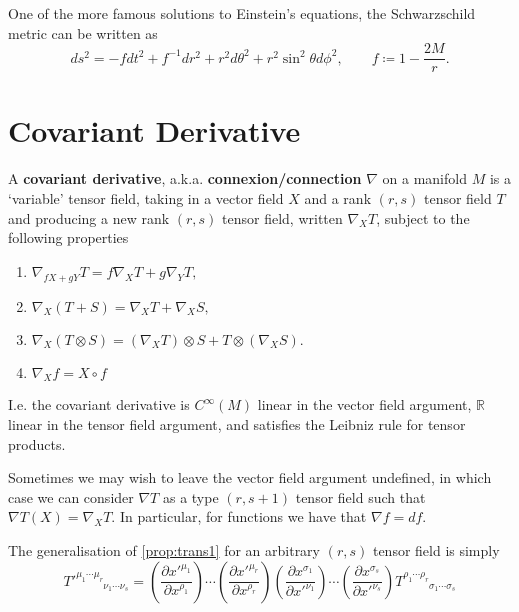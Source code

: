 \documentclass[12pt]{article}
\begin{document}
\begin{example}
	One of the more famous solutions to Einstein's equations, the Schwarzschild metric can be written as
		\begin{equation}
			ds^2 = -f dt^2 + f^{-1} dr^2 + r^2 d\theta^2 + r^2 \sin^2\theta d \phi^2, \qquad f \coloneqq 1 - \frac{2M}{r}.
		\end{equation}
\end{example}

\section{Covariant Derivative}

\begin{definition}
	A \textbf{covariant derivative}, a.k.a. \textbf{connexion/connection} $\nabla$ on a manifold $M$ is a `variable' tensor field, taking in a vector field $X$ and a rank $(r,s)$ tensor field $T$ and producing a new rank $(r,s)$ tensor field, written $\nabla_X T$, subject to the following properties
		\begin{enumerate}
			\item $\nabla_{fX + gY} T = f \nabla_X T + g \nabla_Y T,$
			\item $\nabla_X(T + S) = \nabla_X T + \nabla_X S, $
			\item $\nabla_X(T \otimes S) = \left( \nabla_X T \right) \otimes S + T \otimes \left( \nabla_X S \right).$
			\item $\nabla_X f = X \circ f$
		\end{enumerate}
	I.e. the covariant derivative is $C^\infty(M)$ linear in the vector field argument, $\mathbb{R}$ linear in the tensor field argument, and satisfies the Leibniz rule for tensor products.
\end{definition}
\begin{remark}
	Sometimes we may wish to leave the vector field argument undefined, in which case we can consider $\nabla T$ as a type $(r,s+1)$ tensor field such that $\nabla T (X) = \nabla_X T$. In particular, for functions we have that $\nabla f = df$.
\end{remark}

\begin{noteEquation}
	The generalisation of \autoref{prop:trans1} for an arbitrary $(r,s)$ tensor field is simply
		\begin{equation}
			T'^{\mu_1 \cdots \mu_r}_{\phantom{\mu_1 \cdots \mu_r} \nu_1 \cdots \nu_s} = \left( \frac{\partial x'^{\mu_1}}{\partial x^{\rho_1}} \right) \cdots \left( \frac{\partial x'^{\mu_r}}{\partial x^{\rho_r}} \right) \left( \frac{\partial x^{\sigma_1}}{\partial x'^{\nu_1}} \right) \cdots \left( \frac{\partial x^{\sigma_s}}{\partial x'^{\nu_s}} \right) T^{\rho_1 \cdots \rho_r}_{\phantom{\rho_1 \cdots \rho_r} \sigma_1 \cdots \sigma_s}
		\end{equation}
\end{noteEquation}
\end{document}
